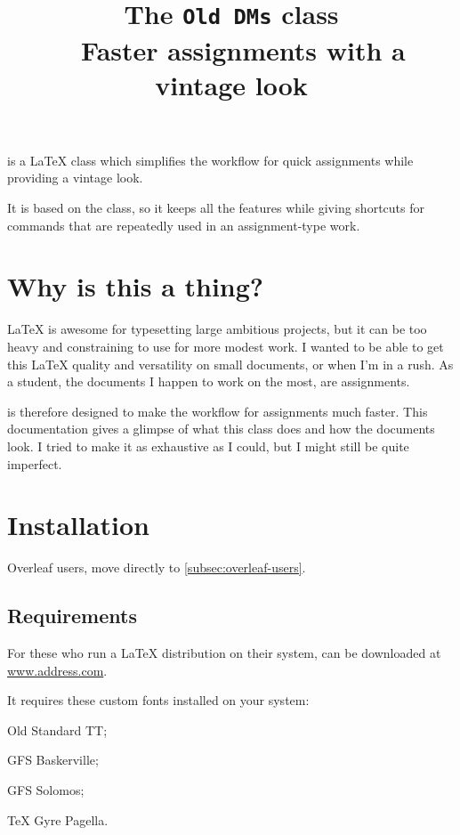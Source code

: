 \documentclass[a4paper, 11pt]{old-dms}
\title{\bfseries \huge The \texttt{Old DMs} class \\~ \vskip -1 \baselineskip \Large Faster assignments with a vintage look}
\date{}
\author{}
\begin{document}
\maketitle

 is a \LaTeX{} class which simplifies the workflow for quick assignments while providing a vintage look.

It is based on the  class, so it keeps all the features while giving shortcuts for commands that are repeatedly used in an assignment-type work.


\setcounter{tocdepth}{2}
\tableofcontents

\newpage


\section*{Why is this a thing?}

\LaTeX{} is awesome for typesetting large ambitious projects, but it can be too heavy and constraining to use for more modest work. I wanted to be able to get this \LaTeX{} quality and versatility on small documents, or when I'm in a rush. As a student, the documents I happen to work on the most, are assignments.

 is therefore designed to make the workflow for assignments much faster. This documentation gives a glimpse of what this class does and how the documents look. I tried to make it as exhaustive as I could, but I might still be quite imperfect.


\section{Installation}

Overleaf users, move directly to \ref{subsec:overleaf-users}.

\subsection{Requirements}

For these who run a \LaTeX{} distribution on their system,  can be downloaded at \url{www.address.com}. 

It requires these custom fonts installed on your system:
\begin{ul}
    \item Old Standard TT;
    \item GFS Baskerville;
    \item GFS Solomos;
    \item \TeX{} Gyre Pagella.
\end{ul}
\end{document}
